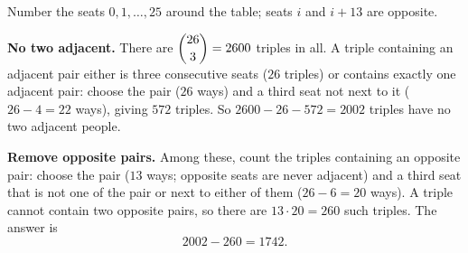 Number the seats $0,1,\dots,25$ around the table; seats $i$ and $i+13$ are opposite.

\textbf{No two adjacent.} There are $\dbinom{26}{3}=2600$ triples in all. A triple containing an adjacent pair either is three consecutive seats ($26$ triples) or contains exactly one adjacent pair: choose the pair ($26$ ways) and a third seat not next to it ($26-4=22$ ways), giving $572$ triples. So $2600-26-572=2002$ triples have no two adjacent people.

\textbf{Remove opposite pairs.} Among these, count the triples containing an opposite pair: choose the pair ($13$ ways; opposite seats are never adjacent) and a third seat that is not one of the pair or next to either of them ($26-6=20$ ways). A triple cannot contain two opposite pairs, so there are $13\cdot20=260$ such triples. The answer is
\[
2002-260=\boxed{1742}.
\]
